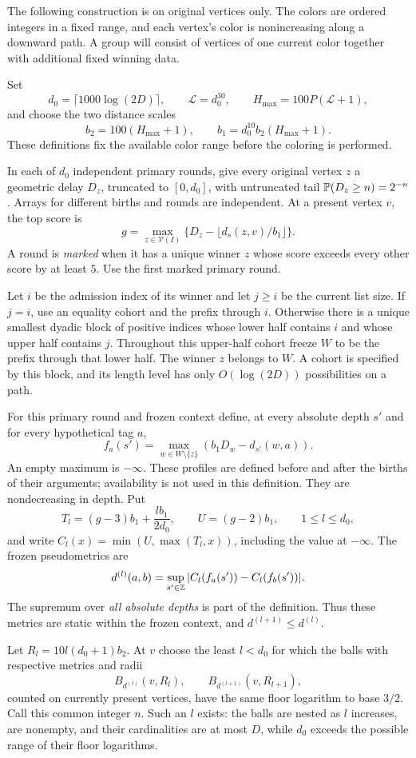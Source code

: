The following construction is on original vertices only.  The colors
are ordered integers in a fixed range, and each vertex's color is
nonincreasing along a downward path.  A group will consist of vertices
of one current color together with additional fixed winning data.

Set
\[
 d_0=\lceil1000\log(2D)\rceil,\qquad
 \mathcal L=d_0^{30},\qquad H_{\max}=100P(\mathcal L+1),
\]
and choose the two distance scales
\[
 b_2=100(H_{\max}+1),\qquad
 b_1=d_0^{10}b_2(H_{\max}+1).
\]
These definitions fix the available color range before the coloring
is performed.

In each of $d_0$ independent primary rounds, give every original vertex
$z$ a geometric delay $D_z$, truncated to $[0,d_0]$, with untruncated
tail $\mathbb P(D_z\ge n)=2^{-n}$.  Arrays for different births and rounds
are independent.  At a present vertex $v$, the top score is
\[
 g=\max_{z\in\mathcal V(I)}
       \{D_z-\lfloor d_s(z,v)/b_1\rfloor\}.
\]
A round is \emph{marked} when it has a unique winner $z$ whose score
exceeds every other score by at least $5$.  Use the first marked primary
round.

Let $i$ be the admission index of its winner and let $j\ge i$ be the
current list size.  If $j=i$, use an equality cohort and the prefix
through $i$.  Otherwise there is a unique smallest dyadic block of
positive indices whose lower half contains $i$ and whose upper half
contains $j$.  Throughout this upper-half cohort freeze $W$ to be the
prefix through that lower half.  The winner $z$ belongs to $W$.
A cohort is specified by this block, and its length level has only
$O(\log(2D))$ possibilities on a path.

For this primary round and frozen context define, at every absolute
depth $s'$ and for every hypothetical tag $a$,
\[
 f_a(s')=\max_{w\in W\setminus\{z\}}
             (b_1D_w-d_{s'}(w,a)).
\]
An empty maximum is $-\infty$.  These profiles are defined before and
after the births of their arguments; availability is not used in this
definition.  They are nondecreasing in depth.  Put
\[
 T_l=(g-3)b_1+\frac{l b_1}{2d_0},\qquad
 U=(g-2)b_1,\qquad 1\le l\le d_0,
\]
and write $C_l(x)=\min(U,\max(T_l,x))$, including the value at
$-\infty$.  The frozen pseudometrics are
\[
 d^{(l)}(a,b)=\sup_{s'\in\mathbb Z}
          |C_l(f_a(s'))-C_l(f_b(s'))|.
\]
The supremum over \emph{all absolute depths} is part of the definition.
Thus these metrics are static within the frozen context, and
$d^{(l+1)}\le d^{(l)}$.

Let $R_l=10l(d_0+1)b_2$.  At $v$ choose the least $l<d_0$ for which the
balls with respective metrics and radii
\[
 B_{d^{(l)}}(v,R_l),\qquad
 B_{d^{(l+1)}}(v,R_{l+1}),
\]
counted on currently present vertices, have the same floor logarithm to
base $3/2$.  Call this common integer $n$.  Such an $l$ exists: the balls
are nested as $l$ increases, are nonempty, and their cardinalities are
at most $D$, while $d_0$ exceeds the possible range of their floor
logarithms.

